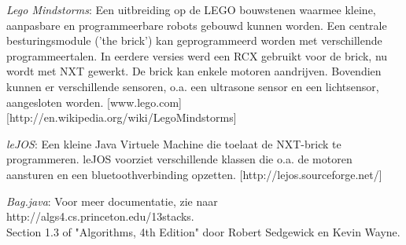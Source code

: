 \documentclass[tt3]{penoverslag}
\begin{document}







\begin{thebibliography}{9}

\textit{Lego Mindstorms}:  Een uitbreiding op de LEGO bouwstenen waarmee kleine, aanpasbare en programmeerbare robots gebouwd kunnen worden. Een centrale besturingsmodule ('the brick') kan geprogrammeerd worden met verschillende programmeertalen. In eerdere versies werd een RCX gebruikt voor de brick, nu wordt met NXT gewerkt. De brick kan enkele motoren aandrijven. Bovendien kunnen er verschillende sensoren, o.a. een ultrasone sensor en een lichtsensor, aangesloten worden.  \mbox{[www.lego.com]} \mbox{[http://en.wikipedia.org/wiki/Lego\textendash Mindstorms]}

\textit{leJOS}:  Een kleine Java Virtuele Machine die toelaat de NXT-brick te programmeren. leJOS voorziet verschillende klassen die o.a. de motoren aansturen en een bluetoothverbinding opzetten.  \mbox{[http://lejos.sourceforge.net/]}

\textit{Bag.java}: Voor meer documentatie, zie naar http://algs4.cs.princeton.edu/13stacks. \\
Section 1.3 of "Algorithms, 4th Edition" door Robert Sedgewick en Kevin Wayne.

\end{thebibliography}
\end{document}
